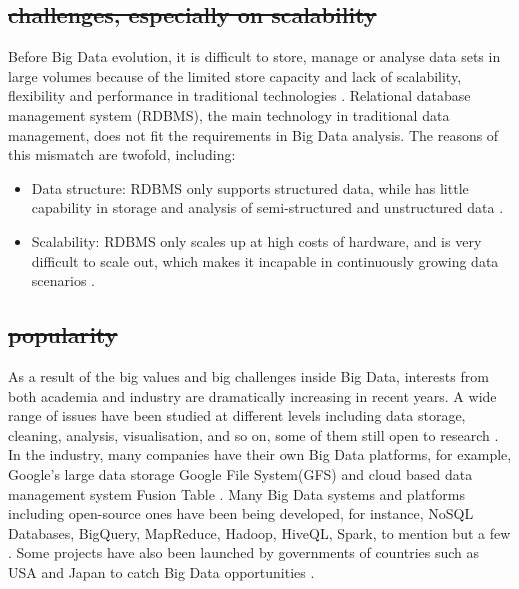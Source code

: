 \documentclass[conference]{IEEEtran}
\providecommand{\tightlist}{%
  \setlength{\itemsep}{0pt}\setlength{\parskip}{0pt}
}
\begin{document}
\hypertarget{challenges-especially-on-scalability}{%
\subsection{\texorpdfstring{\sout{challenges, especially on
scalability}}{challenges, especially on scalability}}\label{challenges-especially-on-scalability}}

Before Big Data evolution, it is difficult to store, manage or analyse
data sets in large volumes because of the limited store capacity and
lack of scalability, flexibility and performance in traditional
technologies \autocite{OUSSOUS2018431}. Relational database management
system (RDBMS), the main technology in traditional data management, does
not fit the requirements in Big Data analysis. The reasons of this
mismatch are twofold, including:

\begin{itemize}
\tightlist
\item
  Data structure: RDBMS only supports structured data, while has little
  capability in storage and analysis of semi-structured and unstructured
  data \autocite{hu2014}.
\item
  Scalability: RDBMS only scales up at high costs of hardware, and is
  very difficult to scale out, which makes it incapable in continuously
  growing data scenarios \autocite{hu2014,SIVARAJAH2017}.
\end{itemize}

\hypertarget{popularity}{%
\subsection{\texorpdfstring{\sout{popularity}}{popularity}}\label{popularity}}

As a result of the big values and big challenges inside Big Data,
interests from both academia and industry are dramatically increasing in
recent years. A wide range of issues have been studied at different
levels including data storage, cleaning, analysis, visualisation, and so
on, some of them still open to research \autocite{OUSSOUS2018431}. In
the industry, many companies have their own Big Data platforms, for
example, Google's large data storage Google File System(GFS) and cloud
based data management system Fusion Table \autocite{Hewage2018}. Many
Big Data systems and platforms including open-source ones have been
being developed, for instance, NoSQL Databases, BigQuery, MapReduce,
Hadoop, HiveQL, Spark, to mention but a few
\autocite{Hewage2018,SIVARAJAH2017,hu2014}. Some projects have also been
launched by governments of countries such as USA and Japan to catch Big
Data opportunities \autocite{OUSSOUS2018431}.
\end{document}
